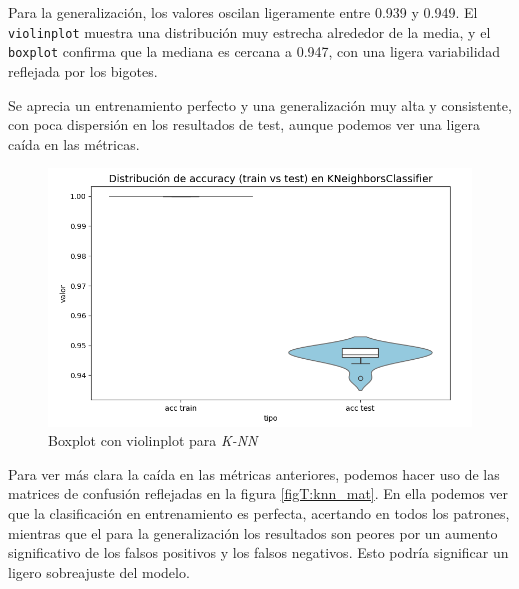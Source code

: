 \vspace{1em}

Para la generalización, los valores oscilan ligeramente entre 0.939 y 0.949. El \texttt{violinplot} muestra una distribución muy estrecha alrededor de la media, y el \texttt{boxplot} confirma que la mediana es cercana a 0.947, con una ligera variabilidad reflejada por los bigotes.

\vspace{1em}

Se aprecia un entrenamiento perfecto y una generalización muy alta y consistente, con poca dispersión en los resultados de test, aunque podemos ver una ligera caída en las métricas.

\begin{figure}[H]
	\centering
	\includegraphics[width=1\linewidth]{Imagenes/knn_bin}
	\caption[Boxplot con violinplot para \textit{K-NN}]{Boxplot con violinplot para \textit{K-NN}}
	\label{fig:knn_bin}
\end{figure}

Para ver más clara la caída en las métricas anteriores, podemos hacer uso de las matrices de confusión reflejadas en la figura \ref{figT:knn_mat}. En ella podemos ver que la clasificación en entrenamiento es perfecta, acertando en todos los patrones, mientras que el para la generalización los resultados son peores por un aumento significativo de los falsos positivos y los falsos negativos. Esto podría significar un ligero sobreajuste del modelo.

